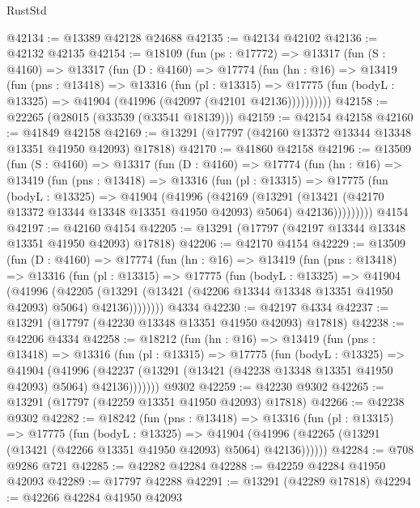 \begin{lexlean}{RustStd}
\begin{coremodule}
@42134 := @13389 @42128 @24688
@42135 := @42134 @42102
@42136 := @42132 @42135
@42154 := @18109
    (fun (ps : @17772) =>
    @13317
      (fun (S : @4160) =>
      @13317
        (fun (D : @4160) =>
        @17774
          (fun (hn : @16) =>
          @13419
            (fun (pns : @13418) =>
            @13316
              (fun (pl : @13315) =>
              @17775 (fun (bodyL : @13325) => @41904 (@41996 (@42097 (@42101 @42136))))))))))
@42158 := @22265 (@28015 (@33539 (@33541 @18139)))
@42159 := @42154 @42158
@42160 := @41849 @42158
@42169 := @13291 (@17797 (@42160 @13372 @13344 @13348 @13351 @41950 @42093) @17818)
@42170 := @41860 @42158
@42196 := @13509
    (fun (S : @4160) =>
    @13317
      (fun (D : @4160) =>
      @17774
        (fun (hn : @16) =>
        @13419
          (fun (pns : @13418) =>
          @13316
            (fun (pl : @13315) =>
            @17775
              (fun (bodyL : @13325) =>
              @41904
                (@41996
                  (@42169
                    (@13291
                      (@13421 (@42170 @13372 @13344 @13348 @13351 @41950 @42093) @5064)
                      @42136)))))))))
    @4154
@42197 := @42160 @4154
@42205 := @13291 (@17797 (@42197 @13344 @13348 @13351 @41950 @42093) @17818)
@42206 := @42170 @4154
@42229 := @13509
    (fun (D : @4160) =>
    @17774
      (fun (hn : @16) =>
      @13419
        (fun (pns : @13418) =>
        @13316
          (fun (pl : @13315) =>
          @17775
            (fun (bodyL : @13325) =>
            @41904
              (@41996
                (@42205
                  (@13291 (@13421 (@42206 @13344 @13348 @13351 @41950 @42093) @5064) @42136))))))))
    @4334
@42230 := @42197 @4334
@42237 := @13291 (@17797 (@42230 @13348 @13351 @41950 @42093) @17818)
@42238 := @42206 @4334
@42258 := @18212
    (fun (hn : @16) =>
    @13419
      (fun (pns : @13418) =>
      @13316
        (fun (pl : @13315) =>
        @17775
          (fun (bodyL : @13325) =>
          @41904
            (@41996
              (@42237 (@13291 (@13421 (@42238 @13348 @13351 @41950 @42093) @5064) @42136)))))))
    @9302
@42259 := @42230 @9302
@42265 := @13291 (@17797 (@42259 @13351 @41950 @42093) @17818)
@42266 := @42238 @9302
@42282 := @18242
    (fun (pns : @13418) =>
    @13316
      (fun (pl : @13315) =>
      @17775
        (fun (bodyL : @13325) =>
        @41904 (@41996 (@42265 (@13291 (@13421 (@42266 @13351 @41950 @42093) @5064) @42136))))))
@42284 := @708 @9286 @721
@42285 := @42282 @42284
@42288 := @42259 @42284 @41950 @42093
@42289 := @17797 @42288
@42291 := @13291 (@42289 @17818)
@42294 := @42266 @42284 @41950 @42093

\end{coremodule}
\end{lexlean}
